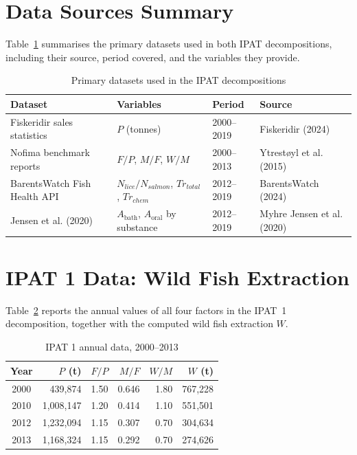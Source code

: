 \documentclass[12pt, a4paper]{report}
\begin{document}
\section{Data Sources Summary}

Table~\ref{tab:datasources} summarises the primary datasets used in 
both IPAT decompositions, including their source, period covered, 
and the variables they provide.

\begin{table}[H]
\centering
\caption{Primary datasets used in the IPAT decompositions}
\begin{tabular}{llll}
\hline
\textbf{Dataset} & \textbf{Variables} & \textbf{Period} & \textbf{Source} \\
\hline
Fiskeridir sales statistics & $P$ (tonnes) & 2000--2019 & Fiskeridir (2024) \\[4pt]
Nofima benchmark reports & $F/P$, $M/F$, $W/M$ & 2000--2013 & Ytrestøyl et al. (2015) \\[4pt]
BarentsWatch Fish Health API & $N_{lice}/N_{salmon}$, $Tr_{total}$, $Tr_{chem}$ & 2012--2019 & BarentsWatch (2024) \\[4pt]
Jensen et al. (2020) & $A_{\text{bath}}$, $A_{\text{oral}}$ by substance & 2012--2019 & Myhre Jensen et al. (2020) \\
\hline
\end{tabular}
\label{tab:datasources}
\end{table}

\section{IPAT 1 Data: Wild Fish Extraction}

Table~\ref{tab:ipat1data} reports the annual values of all four 
factors in the IPAT~1 decomposition, together with the computed 
wild fish extraction $W$.

\begin{table}[H]
\centering
\caption{IPAT 1 annual data, 2000--2013}
\begin{tabular}{crrrrr}
\hline
\textbf{Year} & \textbf{$P$ (t)} & \textbf{$F/P$} & \textbf{$M/F$} & \textbf{$W/M$} & \textbf{$W$ (t)} \\
\hline
2000 & 439,874 & 1.50 & 0.646 & 1.80 & 767,228 \\
2010 & 1,008,147 & 1.20 & 0.414 & 1.10 & 551,501 \\
2012 & 1,232,094 & 1.15 & 0.307 & 0.70 & 304,634 \\
2013 & 1,168,324 & 1.15 & 0.292 & 0.70 & 274,626 \\
\hline
\end{tabular}
\label{tab:ipat1data}
\end{table}
\end{document}
